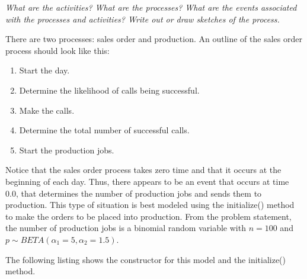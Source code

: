 \documentclass[
]{book}
\theoremstyle{definition}
\theoremstyle{definition}
\theoremstyle{definition}
\theoremstyle{definition}
\theoremstyle{remark}
\begin{document}
\emph{What are the activities? What are the processes? What are the events associated with the processes and activities? Write out or draw sketches of the process.}

There are two processes: sales order and production. An outline of the
sales order process should look like this:

\begin{enumerate}
\def\labelenumi{\arabic{enumi}.}
\item
  Start the day.
\item
  Determine the likelihood of calls being successful.
\item
  Make the calls.
\item
  Determine the total number of successful calls.
\item
  Start the production jobs.
\end{enumerate}

Notice that the sales order process takes zero time and that it occurs
at the beginning of each day. Thus, there appears to be an event that
occurs at time 0.0, that determines the number of production jobs and
sends them to production. This type of situation is best modeled using
the initialize() method to make the orders to be placed into production.
From the problem statement, the number of production jobs is a binomial
random variable with \(n= 100\) and
\(p \sim BETA(\alpha_1 = 5,\alpha_2 = 1.5)\).

The following listing shows the constructor for this model and the
initialize() method.
\end{document}
